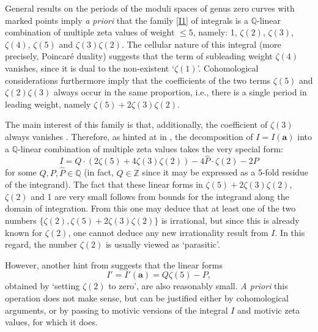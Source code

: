 \documentclass[12pt,reqno]{amsart}
\theoremstyle{remark}
\newcommand\ba{\boldsymbol a}
\begin{document}
General results on the periods of the  moduli spaces  of genus zero curves with marked points \cite{Br09} imply \emph{a priori} that the family \eqref{I1} of integrals is a $\mathbb Q$-linear combination of multiple zeta values of weight $\leq 5$, namely: 1, $\zeta(2)$, $\zeta(3)$, $\zeta(4)$, $\zeta(5)$ and $\zeta(3) \zeta(2)$.  The cellular nature of this integral  (more precisely, Poincar\'e duality)   suggests that the term of subleading weight  $\zeta(4)$ vanishes, since it is dual to the non-existent `$\zeta(1)$'. Cohomological considerations furthermore imply that the  coefficients  of the two terms  $\zeta(5)$ and $\zeta(2)\zeta(3)$ always occur in the same proportion, i.e.,  there is a single period in leading weight, namely $ \zeta(5) + 2 \zeta(3) \zeta(2)$. 

The main interest of this family is that, additionally, the coefficient of $\zeta(3)$ always vanishes \cite[Sect.~10.2.4]{Br16}. 
Therefore, as  hinted at in \cite{Br16}, the decomposition of $I=I(\ba)$ into a $\mathbb Q$-linear combination of multiple zeta values takes the   very special form:
\begin{equation} 
I=Q\cdot(2\zeta(5)+4\zeta(3)\zeta(2))-4\hat P\cdot\zeta(2)-2P
\label{deco}
\end{equation}
for some $Q,P,\hat P\in\mathbb Q$ (in fact, $Q\in\mathbb Z$ since it may be expressed as a 5-fold residue of the integrand).
The fact that these  linear forms in $\zeta(5)+2\zeta(3)\zeta(2)$, $\zeta(2)$ and 1 are very small  follows from bounds for the integrand along the domain of integration.  From this one may deduce that  at least one of the two numbers $\{\zeta(2), \zeta(5) + 2\zeta(3)\zeta(2)\}$ is irrational, but since this is already known for  $\zeta(2)$, one cannot deduce any new irrationality result from $I$. In this regard, the number $\zeta(2)$ is usually viewed as `parasitic'. 



However, another hint from \cite{Br16}  suggests that  the linear forms
\[
I'=I'(\ba)=Q\zeta(5)-P,
\]
obtained by `setting $\zeta(2)$ to zero', are also reasonably small.
 \emph{A priori} this operation does not make sense, but  can be justified  either by cohomological arguments, or by  passing to motivic versions of the integral $I$ and  motivic zeta values, for which it does. 
 
\end{document}

